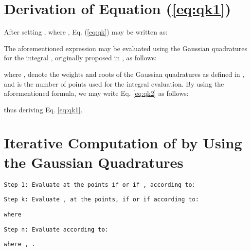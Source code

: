 \documentclass[12pt,draftcls, onecolumn]{IEEEtran}
\begin{document}
\appendices 

\section{Derivation of Equation (\ref{eq:qk1})}
\label{a4}

After setting , where , Eq. (\ref{eq:qk}) may be written as:

\begingroup

\endgroup

\noindent The aforementioned expression may be evaluated using the Gaussian quadratures for the integral , originally proposed in \cite[Table II, N=15]{1969method}, as follows:


\noindent where ,  denote the weights and roots of the Gaussian quadratures as defined in \cite[Table II, N=15]{1969method}, and  is the number of points used for the integral evaluation. By using the aforementioned formula, we may write Eq. \eqref{eq:qk2} as follows:
\begingroup

\endgroup
thus deriving Eq. \eqref{eq:qk1}.

\section{Iterative Computation of  by Using the Gaussian Quadratures}
\label{a1}

\begin{flushleft}
\texttt{Step 1: Evaluate  at the points  if
 or  if , according to:}
\end{flushleft}


\begingroup
\footnotesize

\endgroup


\begin{flushleft}
\texttt{Step k: Evaluate ,  at the points,  if
 or  if  according to:}
\end{flushleft}

\begingroup
\tiny

\endgroup

\begin{flushleft}
\texttt{where  }
\end{flushleft}

\begin{flushleft}
\texttt{Step n: Evaluate  according to:}
\end{flushleft}

\begingroup
\footnotesize

\endgroup

\begin{flushleft}
\texttt{where , .}
\end{flushleft}
\end{document}

